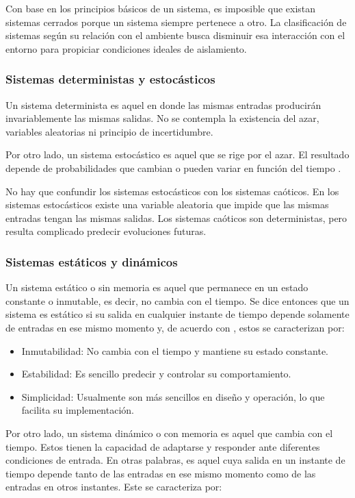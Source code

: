 Con base en los principios básicos de un sistema, es imposible que existan sistemas cerrados porque un sistema siempre pertenece a otro. La clasificación de sistemas según su relación con el ambiente busca disminuir esa interacción con el entorno para propiciar condiciones ideales de aislamiento.

\subsubsection{Sistemas deterministas y estocásticos}

Un sistema determinista es aquel en donde las mismas entradas producirán invariablemente las mismas salidas. No se contempla la existencia del azar, variables aleatorias ni principio de incertidumbre.

Por otro lado, un sistema estocástico es aquel que se rige por el azar. El resultado depende de probabilidades que cambian o pueden variar en función del tiempo \cite{Rojas2018_probablistisco}.

No hay que confundir los sistemas estocásticos con los sistemas caóticos. En los sistemas estocásticos existe una variable aleatoria que impide que las mismas entradas tengan las mismas salidas. Los sistemas caóticos son deterministas, pero resulta complicado predecir evoluciones futuras. 

\subsubsection{Sistemas estáticos y dinámicos}

Un sistema estático o sin memoria es aquel que permanece en un estado constante o inmutable, es decir, no cambia con el tiempo. Se dice entonces que un sistema es estático si su salida en cualquier instante de tiempo depende solamente de entradas en ese mismo momento y, de acuerdo con \cite{TGS2025_estatico}, estos se caracterizan por:

\begin{itemize}
	\item Inmutabilidad: No cambia con el tiempo y mantiene su estado constante.
	\item Estabilidad: Es sencillo predecir y controlar su comportamiento.
	\item Simplicidad: Usualmente son más sencillos en diseño y operación, lo que facilita su implementación. 
\end{itemize} 

Por otro lado, un sistema dinámico o con memoria es aquel que cambia con el tiempo. Estos tienen la capacidad de adaptarse y responder ante diferentes condiciones de entrada. En otras palabras, es aquel cuya salida en un instante de tiempo depende tanto de las entradas en ese mismo momento como de las entradas en otros instantes. Este se caracteriza por:

